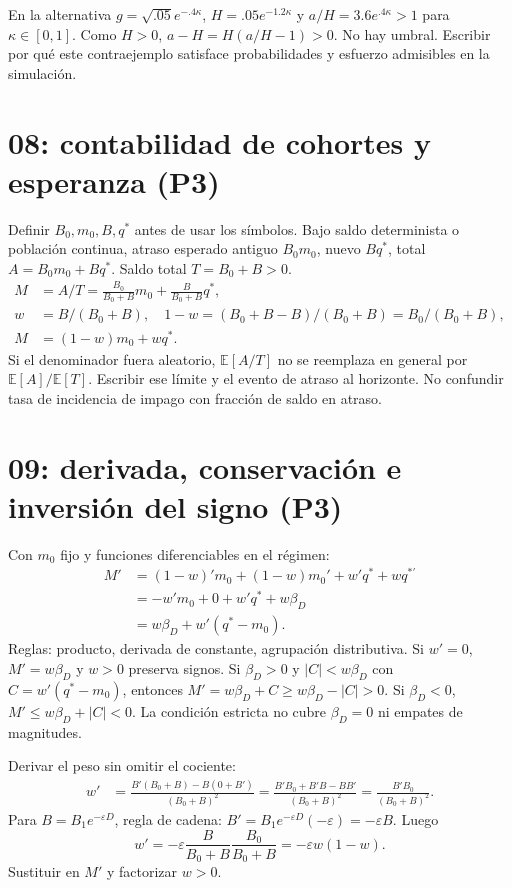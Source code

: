 \documentclass[11pt]{article}
\newcommand{\E}{\mathbb E}
\begin{document}
En la alternativa $g=\sqrt{.05}e^{-.4\kappa}$,
$H=.05e^{-1.2\kappa}$ y $a/H=3.6e^{.4\kappa}>1$ para $\kappa\in[0,1]$.
Como $H>0$, $a-H=H(a/H-1)>0$. No hay umbral. Escribir por qué este
contraejemplo satisface probabilidades y esfuerzo admisibles en la simulación.

\section{08: contabilidad de cohortes y esperanza (P3)}
Definir $B_0,m_0,B,q^*$ antes de usar los símbolos. Bajo saldo determinista o
población continua, atraso esperado antiguo $B_0m_0$, nuevo $Bq^*$, total
$A=B_0m_0+Bq^*$. Saldo total $T=B_0+B>0$.
\begin{align*}
M&=A/T=\frac{B_0}{B_0+B}m_0+\frac{B}{B_0+B}q^*,\\
w&=B/(B_0+B),\quad
1-w=(B_0+B-B)/(B_0+B)=B_0/(B_0+B),\\
M&=(1-w)m_0+wq^*.
\end{align*}
Si el denominador fuera aleatorio, $\E[A/T]$ no se reemplaza en general por
$\E[A]/\E[T]$. Escribir ese límite y el evento de atraso al horizonte. No
confundir tasa de incidencia de impago con fracción de saldo en atraso.

\section{09: derivada, conservación e inversión del signo (P3)}
Con $m_0$ fijo y funciones diferenciables en el régimen:
\begin{align*}
M'&=(1-w)'m_0+(1-w)m_0'+w'q^*+wq^{*\prime}\\
&=-w'm_0+0+w'q^*+w\beta_D\\
&=w\beta_D+w'(q^*-m_0).
\end{align*}
Reglas: producto, derivada de constante, agrupación distributiva.
Si $w'=0$, $M'=w\beta_D$ y $w>0$ preserva signos.
Si $\beta_D>0$ y $|C|<w\beta_D$ con $C=w'(q^*-m_0)$, entonces
$M'=w\beta_D+C\ge w\beta_D-|C|>0$.
Si $\beta_D<0$, $M'\le w\beta_D+|C|<0$.
La condición estricta no cubre $\beta_D=0$ ni empates de magnitudes.

Derivar el peso sin omitir el cociente:
\begin{align*}
w'&=\frac{B'(B_0+B)-B(0+B')}{(B_0+B)^2}
=\frac{B'B_0+B'B-BB'}{(B_0+B)^2}
=\frac{B'B_0}{(B_0+B)^2}.
\end{align*}
Para $B=B_1e^{-\varepsilon D}$, regla de cadena:
$B'=B_1e^{-\varepsilon D}(-\varepsilon)=-\varepsilon B$.
Luego
\[
w'=-\varepsilon\frac{B}{B_0+B}\frac{B_0}{B_0+B}
=-\varepsilon w(1-w).
\]
Sustituir en $M'$ y factorizar $w>0$.
\end{document}
